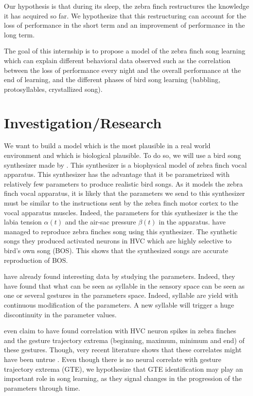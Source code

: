 \documentclass[a4paper, 11pt]{article}
\begin{document}
Our hypothesis is that during its sleep, the zebra finch restructures the
knowledge it has acquired so far. We hypothesize that this restructuring can
account for the loss of performance in the short term and an improvement of
performance in the long term.

The goal of this internship is to propose a model of the zebra finch song
learning which can explain different behavioral data observed such as the
correlation between the loss of performance every night and the overall
performance at the end of learning, and the different phases of bird song
learning (babbling, protosyllables, crystallized song).

\section*{Investigation/Research}

We want to build a model which is the most plausible in a real world environment
and which is biological plausible. To do so, we will use a bird song synthesizer
made by \textcite{boari_automatic_2015}. This synthesizer is a biophysical model
of zebra finch vocal apparatus. This synthesizer has the advantage that it be
parametrized with relatively few parameters to produce realistic bird songs. As
it models the zebra finch vocal apparatus, it is likely that the parameters we
send to this synthesizer must be similar to the instructions sent by the zebra
finch motor cortex to the vocal apparatus muscles. Indeed, the parameters for
this synthesizer is the the labia tension \(\alpha(t)\) and the air-sac pressure
\(\beta(t)\) in the apparatus.
\textcite{amador_elemental_2013, boari_automatic_2015} have managed to reproduce
zebra finches song using this synthesizer. The synthetic songs they produced
activated neurons in HVC which are highly selective to bird's own song (BOS).
This shows that the synthesized songs are accurate reproduction of BOS.

\textcite{amador_low_2014, boari_automatic_2015} have already found interesting
data by studying the parameters. Indeed, they have found that what can be seen
as syllable in the sensory space can be seen as one or several gestures in the
parameters space. Indeed, syllable are yield with continuous modification of the
parameters. A new syllable will trigger a huge discontinuity in the parameter
values.

\textcite{amador_elemental_2013} even claim to have found correlation with HVC
neuron spikes in zebra finches and the gesture trajectory extrema (beginning,
maximum, minimum and end) of these gestures. Though, very recent literature
shows that these correlates might have been untrue
\parencite{lynch_rhythmic_2016, picardo_population-level_2016}. Even though
there is no neural correlate with gesture trajectory extrema (GTE), we
hypothesize that GTE identification may play an important role in song learning,
as they signal changes in the progression of the parameters through time.
\end{document}
